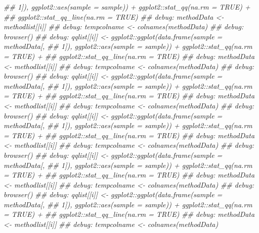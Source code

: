 \documentclass[]{article}
\newcommand{\hlcom}[1]{\textcolor[rgb]{0.502,0.502,0.502}{\textit{#1}}}%
\newenvironment{Shaded}{\begin{myshaded}}{\end{myshaded}}
\newcommand{\DocumentationTok}[1]{\hlcom{#1}}
\begin{document}
\begin{Shaded}
\begin{Highlighting}[]
\DocumentationTok{\#\#     1]), ggplot2::aes(sample = sample)) + ggplot2::stat\_qq(na.rm = TRUE) + }
\DocumentationTok{\#\#     ggplot2::stat\_qq\_line(na.rm = TRUE)}
\DocumentationTok{\#\# debug: methodData \textless{}{-} methodlist[[i]]}
\DocumentationTok{\#\# debug: tempcolname \textless{}{-} colnames(methodData)}
\DocumentationTok{\#\# debug: browser()}
\DocumentationTok{\#\# debug: qqlist[[i]] \textless{}{-} ggplot2::ggplot(data.frame(sample = methodData[, }
\DocumentationTok{\#\#     1]), ggplot2::aes(sample = sample)) + ggplot2::stat\_qq(na.rm = TRUE) + }
\DocumentationTok{\#\#     ggplot2::stat\_qq\_line(na.rm = TRUE)}
\DocumentationTok{\#\# debug: methodData \textless{}{-} methodlist[[i]]}
\DocumentationTok{\#\# debug: tempcolname \textless{}{-} colnames(methodData)}
\DocumentationTok{\#\# debug: browser()}
\DocumentationTok{\#\# debug: qqlist[[i]] \textless{}{-} ggplot2::ggplot(data.frame(sample = methodData[, }
\DocumentationTok{\#\#     1]), ggplot2::aes(sample = sample)) + ggplot2::stat\_qq(na.rm = TRUE) + }
\DocumentationTok{\#\#     ggplot2::stat\_qq\_line(na.rm = TRUE)}
\DocumentationTok{\#\# debug: methodData \textless{}{-} methodlist[[i]]}
\DocumentationTok{\#\# debug: tempcolname \textless{}{-} colnames(methodData)}
\DocumentationTok{\#\# debug: browser()}
\DocumentationTok{\#\# debug: qqlist[[i]] \textless{}{-} ggplot2::ggplot(data.frame(sample = methodData[, }
\DocumentationTok{\#\#     1]), ggplot2::aes(sample = sample)) + ggplot2::stat\_qq(na.rm = TRUE) + }
\DocumentationTok{\#\#     ggplot2::stat\_qq\_line(na.rm = TRUE)}
\DocumentationTok{\#\# debug: methodData \textless{}{-} methodlist[[i]]}
\DocumentationTok{\#\# debug: tempcolname \textless{}{-} colnames(methodData)}
\DocumentationTok{\#\# debug: browser()}
\DocumentationTok{\#\# debug: qqlist[[i]] \textless{}{-} ggplot2::ggplot(data.frame(sample = methodData[, }
\DocumentationTok{\#\#     1]), ggplot2::aes(sample = sample)) + ggplot2::stat\_qq(na.rm = TRUE) + }
\DocumentationTok{\#\#     ggplot2::stat\_qq\_line(na.rm = TRUE)}
\DocumentationTok{\#\# debug: methodData \textless{}{-} methodlist[[i]]}
\DocumentationTok{\#\# debug: tempcolname \textless{}{-} colnames(methodData)}
\DocumentationTok{\#\# debug: browser()}
\DocumentationTok{\#\# debug: qqlist[[i]] \textless{}{-} ggplot2::ggplot(data.frame(sample = methodData[, }
\DocumentationTok{\#\#     1]), ggplot2::aes(sample = sample)) + ggplot2::stat\_qq(na.rm = TRUE) + }
\DocumentationTok{\#\#     ggplot2::stat\_qq\_line(na.rm = TRUE)}
\DocumentationTok{\#\# debug: methodData \textless{}{-} methodlist[[i]]}
\DocumentationTok{\#\# debug: tempcolname \textless{}{-} colnames(methodData)}

\end{Highlighting}
\end{Shaded}
\end{document}
